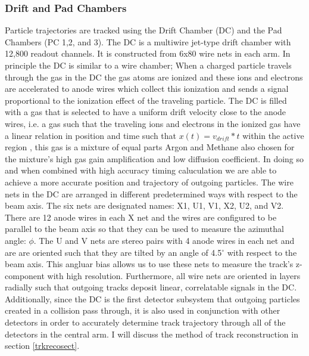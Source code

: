 \subsubsection{Drift and Pad Chambers}
Particle trajectories are tracked using the Drift Chamber (DC) and the Pad Chambers (PC 1,2, and 3). The DC is a multiwire jet-type drift chamber with 12,800 readout channels. It is constructed from 6x80 wire nets in each arm. In principle the DC is similar to a wire chamber; When a charged particle travels through the gas in the DC the gas atoms are ionized and these ions and electrons are accelerated to anode wires which collect this ionization and sends a signal proportional to the ionization effect of the traveling particle. The DC is filled with a gas that is selected to have a uniform drift velocity close to the anode wires, i.e. a gas such that the traveling ions and electrons in the ionized gas have a linear relation in position and time such that $x(t) = v_{drift} * t$ within the active region \citep{DCfocus}, this gas is a mixture of equal parts Argon and Methane also chosen for the mixture's high gas gain amplification and low diffusion coefficient. In doing so and when combined with high accuracy timing caluculation we are able to achieve a more accurate position and trajectory of outgoing particles. The wire nets in the DC are arranged in different predetermined ways with respect to the beam axis. The six nets are designated names: X1, U1, V1, X2, U2, and V2. There are 12 anode wires in each X net and the wires are configured to be parallel to the beam axis so that they can be used to measure the azimuthal angle: $\phi$. The U and V nets are stereo pairs with 4 anode wires in each net and are are oriented such that they are tilted by an angle of 4.5$^\circ$ with respect to the beam axis. This angluar bias allows us to use these nets to measure the track's z-component with high resolution. Furthermore, all wire nets are oriented in layers radially such that outgoing tracks deposit linear, correlatable signals in the DC. Additionally, since the DC is the first detector subsystem that outgoing particles created in a collision pass through, it is also used in conjunction with other detectors in order to accurately determine track trajectory through all of the detectors in the central arm. I will discuss the method of track reconstruction in section \ref{trkrecosect}.

